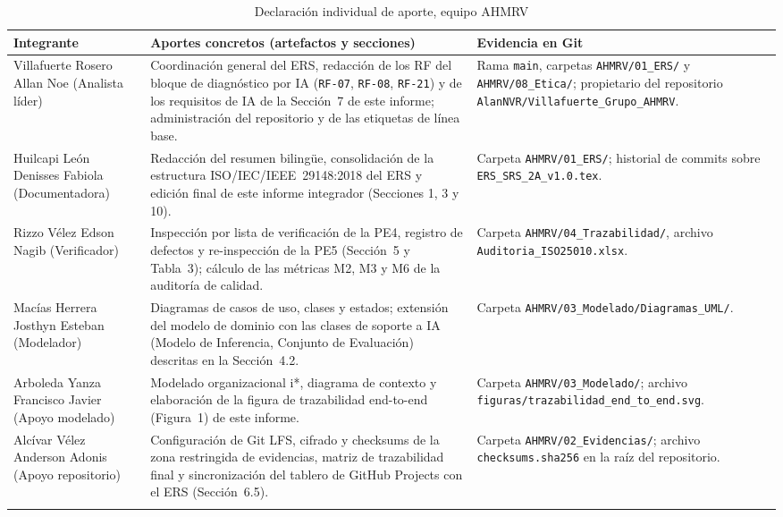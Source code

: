 \documentclass[11pt,a4paper]{article}
\newcommand{\id}[1]{\texttt{#1}}
\begin{document}
\begin{longtable}{|L{3.6cm}|L{6.2cm}|L{3.9cm}|}
\hline
{}\textbf{Integrante} & \textbf{Aportes concretos (artefactos y secciones)} & \textbf{Evidencia en Git} \\
\hline
\endhead
Villafuerte Rosero Allan Noe (Analista líder) & Coordinación general del ERS, redacción de los RF
del bloque de diagnóstico por IA (\id{RF-07}, \id{RF-08}, \id{RF-21}) y de los requisitos de IA de
la Sección~7 de este informe; administración del repositorio y de las etiquetas de línea base. &
Rama \texttt{main}, carpetas \id{AHMRV/01\_ERS/} y \id{AHMRV/08\_Etica/}; propietario del
repositorio \texttt{AlanNVR/Villafuerte\_Grupo\_AHMRV}. \\ \hline
Huilcapi León Denisses Fabiola (Documentadora) & Redacción del resumen bilingüe, consolidación de
la estructura ISO/IEC/IEEE~29148:2018 del ERS y edición final de este informe integrador
(Secciones 1, 3 y 10). & Carpeta \id{AHMRV/01\_ERS/}; historial de commits sobre
\texttt{ERS\_SRS\_2A\_v1.0.tex}. \\ \hline
Rizzo Vélez Edson Nagib (Verificador) & Inspección por lista de verificación de la PE4, registro de
defectos y re-inspección de la PE5 (Sección~5 y Tabla~3); cálculo de las métricas M2, M3 y M6 de la
auditoría de calidad. & Carpeta \id{AHMRV/04\_Trazabilidad/}, archivo
\texttt{Auditoria\_ISO25010.xlsx}. \\ \hline
Macías Herrera Josthyn Esteban (Modelador) & Diagramas de casos de uso, clases y estados;
extensión del modelo de dominio con las clases de soporte a IA (Modelo de Inferencia, Conjunto de
Evaluación) descritas en la Sección~4.2. & Carpeta \id{AHMRV/03\_Modelado/Diagramas\_UML/}. \\
\hline
Arboleda Yanza Francisco Javier (Apoyo modelado) & Modelado organizacional i*, diagrama de
contexto y elaboración de la figura de trazabilidad end-to-end (Figura~1) de este informe. &
Carpeta \id{AHMRV/03\_Modelado/}; archivo \texttt{figuras/trazabilidad\_end\_to\_end.svg}. \\
\hline
Alcívar Vélez Anderson Adonis (Apoyo repositorio) & Configuración de Git LFS, cifrado y checksums
de la zona restringida de evidencias, matriz de trazabilidad final y sincronización del tablero de
GitHub Projects con el ERS (Sección~6.5). & Carpeta \id{AHMRV/02\_Evidencias/}; archivo
\texttt{checksums.sha256} en la raíz del repositorio. \\ \hline
\caption{Declaración individual de aporte, equipo AHMRV}
\end{longtable}
\end{document}
